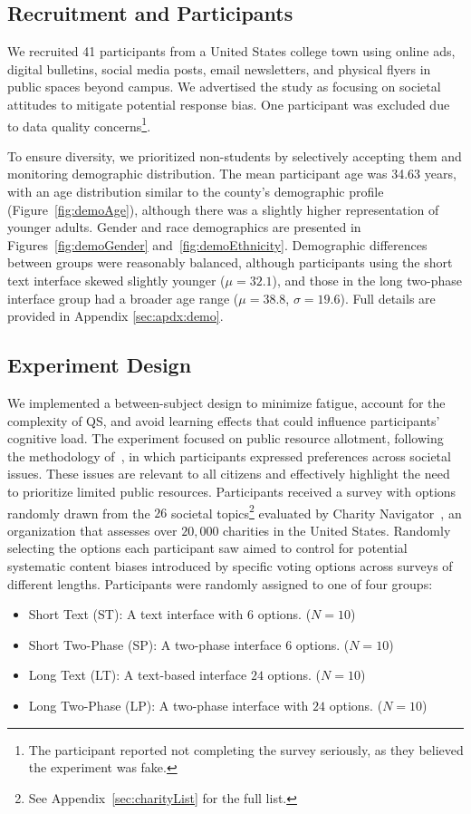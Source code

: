 \subsection{Recruitment and Participants}
We recruited 41 participants from a United States college town using online ads, digital bulletins, social media posts, email newsletters, and physical flyers in public spaces beyond campus. We advertised the study as focusing on societal attitudes to mitigate potential response bias. One participant was excluded due to data quality concerns\footnote{The participant reported not completing the survey seriously, as they believed the experiment was fake.}.

To ensure diversity, we prioritized non-students by selectively accepting them and monitoring demographic distribution. The mean participant age was 34.63 years, with an age distribution similar to the county's demographic profile (Figure~\ref{fig:demoAge}), although there was a slightly higher representation of younger adults. Gender and race demographics are presented in Figures~\ref{fig:demoGender} and~\ref{fig:demoEthnicity}. Demographic differences between groups were reasonably balanced, although participants using the short text interface skewed slightly younger ($\mu = 32.1$), and those in the long two-phase interface group had a broader age range ($\mu = 38.8$, $\sigma = 19.6$). Full details are provided in Appendix \ref{sec:apdx:demo}.


\subsection{Experiment Design}
We implemented a between-subject design to minimize fatigue, account for the complexity of QS, and avoid learning effects that could influence participants' cognitive load. The experiment focused on public resource allotment, following the methodology of~\textcite{chengCanShowWhat2021}, in which participants expressed preferences across societal issues. These issues are relevant to all citizens and effectively highlight the need to prioritize limited public resources. Participants received a survey with options randomly drawn from the $26$ societal topics\footnote{See Appendix~\ref{sec:charityList} for the full list.} evaluated by Charity Navigator~\cite{CharityNavigator2023}, an organization that assesses over $20,000$ charities in the United States.
Randomly selecting the options each participant saw aimed to control for potential systematic content biases introduced by specific voting options across surveys of different lengths. Participants were randomly assigned to one of four groups:
\begin{itemize}
    \item Short Text (ST): A text interface with $6$ options. ($N=10$)
    \item Short Two-Phase (SP): A two-phase interface $6$ options. ($N=10$)
    \item Long Text (LT): A text-based interface $24$ options. ($N=10$)
    \item Long Two-Phase (LP): A two-phase interface with $24$ options. ($N=10$)
\end{itemize}

